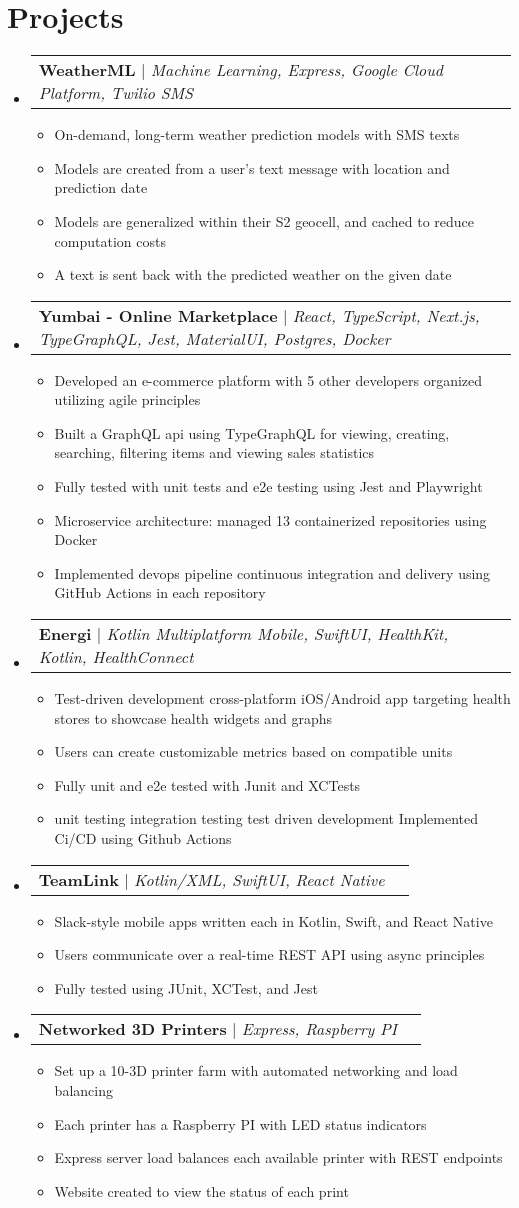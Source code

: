 \documentclass[letterpaper,11pt]{article}
\makeatletter
\newcommand{\resumeItem}[1]{
  \item\small{
    {#1 \vspace{-2pt}}
  }
}
\newcommand{\resumeProjectHeading}[2]{
    \item
    \begin{tabular*}{0.97\textwidth}{l@{\extracolsep{\fill}}r}
      \small#1 & #2 \\
    \end{tabular*}\vspace{-7pt}
}
\newcommand{\resumeSubHeadingListStart}{\begin{itemize}[leftmargin=0.15in, label={}]}
\newcommand{\resumeSubHeadingListEnd}{\end{itemize}}
\newcommand{\resumeItemListStart}{\begin{itemize}}
\newcommand{\resumeItemListEnd}{\end{itemize}\vspace{-5pt}}
\makeatother
\begin{document}
\section{Projects}
    \resumeSubHeadingListStart
      \resumeProjectHeading
          {\textbf{WeatherML} $|$ \emph{Machine Learning, Express, Google Cloud Platform, Twilio SMS}}{}
          \resumeItemListStart
            \resumeItem{On-demand, long-term weather prediction models with SMS texts}
            \resumeItem{Models are created from a user's text message with location and prediction date}
            \resumeItem{Models are generalized within their S2 geocell, and cached to reduce computation costs}
            \resumeItem{A text is sent back with the predicted weather on the given date}
          \resumeItemListEnd
      \resumeProjectHeading
          {\textbf{Yumbai - Online Marketplace} $|$ \emph{React, TypeScript, Next.js, TypeGraphQL, Jest, MaterialUI, Postgres, Docker}}{}
          \resumeItemListStart
            \resumeItem{Developed an e-commerce platform with 5 other developers organized utilizing agile principles}
            \resumeItem{Built a GraphQL api using TypeGraphQL for viewing, creating, searching, filtering items and viewing sales statistics}
            \resumeItem{Fully tested with unit tests and e2e testing using Jest and Playwright}
            \resumeItem{Microservice architecture: managed 13 containerized repositories using Docker}
            \resumeItem{Implemented devops pipeline continuous integration and delivery using GitHub Actions in each repository}
          \resumeItemListEnd
        \resumeProjectHeading
          {\textbf{Energi} $|$ \emph{Kotlin Multiplatform Mobile, SwiftUI, HealthKit, Kotlin, HealthConnect}}{}
          \resumeItemListStart
            \resumeItem{Test-driven development cross-platform iOS/Android app targeting health stores to showcase health widgets and graphs}
            \resumeItem{Users can create customizable metrics based on compatible units}
            \resumeItem{Fully unit and e2e tested with Junit and XCTests}
            \resumeItem{unit testing integration testing test driven development Implemented Ci/CD using Github Actions}
          \resumeItemListEnd
        \resumeProjectHeading
          {\textbf{TeamLink} $|$ \emph{Kotlin/XML, SwiftUI, React Native}}{}
          \resumeItemListStart
            \resumeItem{Slack-style mobile apps written each in Kotlin, Swift, and React Native}
            \resumeItem{Users communicate over a real-time REST API using async principles}
            \resumeItem{Fully tested using JUnit, XCTest, and Jest}
          \resumeItemListEnd
        \resumeProjectHeading
          {\textbf{Networked 3D Printers} $|$ \emph{Express, Raspberry PI}}{}
          \resumeItemListStart
            \resumeItem{Set up a 10-3D printer farm with automated networking and load balancing}
            \resumeItem{Each printer has a Raspberry PI with LED status indicators}
            \resumeItem{Express server load balances each available printer with REST endpoints}
            \resumeItem{Website created to view the status of each print}
          \resumeItemListEnd
    \resumeSubHeadingListEnd
      
\end{document}
